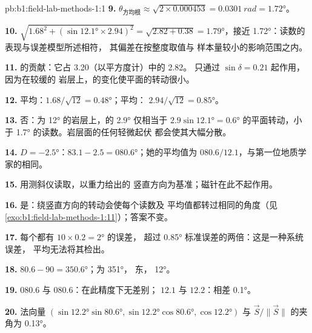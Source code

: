 \begin{solution}{pb:b1:field-lab-methods-1:1}
\textbf{9.} $\theta_{\text{方均根}} \approx \sqrt{2\times0.000453} =
\qty{0.0301}{rad} = \ang{1.72}$。

\textbf{10.} $\sqrt{1.68^2 + (\sin\ang{12.1}\times2.94)^2} = \sqrt{2.82 +
0.38} = \ang{1.79}$，接近 \ang{1.72}：读数的表现与误差模型所述相符，
其偏差在按整度取值与
样本量较小的影响范围之内。

\textbf{11.} 的贡献：它占 3.20（以平方度计）中的 2.82。
只通过 $\sin\delta = 0.21$ 起作用，因为在较缓的
岩层上，的变化使平面的转动很小。

\textbf{12.} 平均：$1.68/\sqrt{12} = \ang{0.48}$；平均：
$2.94/\sqrt{12} = \ang{0.85}$。

\textbf{13.} 否：为 \ang{12} 的岩层上，的 \ang{2.9} 仅相当于
$2.9\sin\ang{12.1} = \ang{0.6}$ 的平面转动，小于
\ang{1.7} 的读数。岩层面的任何轻微起伏
都会使其大幅分散。

\textbf{14.} $D = \ang{-2.5}$：$83.1 - 2.5 = \ang{080.6}$；她的平均值为
$080.6/12.1$，与第一位地质学家的相同。

\textbf{15.} 用测斜仪读取，以重力给出的
竖直方向为基准；磁针在此不起作用。

\textbf{16.} 是：绕竖直方向的转动会使每个读数及
平均值都转过相同的角度（见\cref{exo:b1:field-lab-methods-1:11}）；答案不变。

\textbf{17.} 每个都有 $10\times0.2 = \ang{2}$ 的误差，
超过 \ang{0.85} 标准误差的两倍：这是一种系统误差，
平均无法将其检出。

\textbf{18.} $80.6 - 90 = \ang{350.6}$；为 \ang{351}，
东， \ang{12}。

\textbf{19.}  $080.6$ 与 $080.6$：在此精度下无差别；
 $12.1$ 与 $12.2$：相差 \ang{0.1}。

\textbf{20.} 法向量 $(\sin\ang{12.2}\sin\ang{80.6},
\sin\ang{12.2}\cos\ang{80.6}, \cos\ang{12.2})$ 与 $\vec S/\|\vec S\|$ 的夹角为
\ang{0.13}。


\end{solution}

